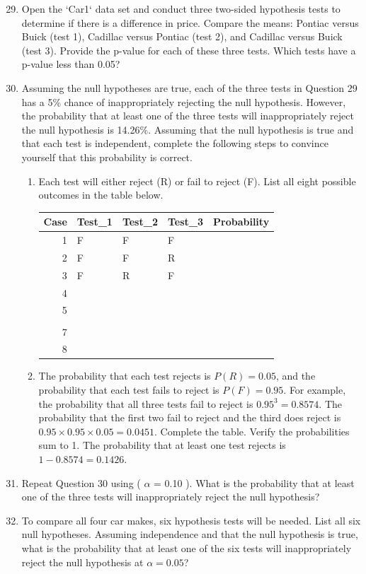 \documentclass[
]{report}
\begin{document}
\begin{enumerate}
  \setcounter{enumi}{28}

  \item Open the `Car1` data set and conduct three two-sided hypothesis tests to determine if there is a difference in price. Compare the means: Pontiac versus Buick (test 1), Cadillac versus Pontiac (test 2), and Cadillac versus Buick (test 3). Provide the p-value for each of these three tests. Which tests have a p-value less than 0.05?

  \item Assuming the null hypotheses are true, each of the three tests in Question 29 has a 5\% chance of inappropriately rejecting the null hypothesis. However, the probability that at least one of the three tests will inappropriately reject the null hypothesis is 14.26\%. Assuming that the null hypothesis is true and that each test is independent, complete the following steps to convince yourself that this probability is correct.
    \begin{enumerate}
      \item Each test will either reject (R) or fail to reject (F). List all eight possible outcomes in the table below.

\begin{tabular}{rllll}
\toprule
Case & Test\_1 & Test\_2 & Test\_3 & Probability\\
\midrule
1 & F & F & F & \\
2 & F & F & R & \\
3 & F & R & F & \\
4 &  &  &  & \\
5 &  &  &  & \\
\addlinespace
6 &  &  &  & \\
7 &  &  &  & \\
8 &  &  &  & \\
\bottomrule
\end{tabular}


      
      \item The probability that each test rejects is \( P(R) = 0.05 \), and the probability that each test fails to reject is \( P(F) = 0.95 \). For example, the probability that all three tests fail to reject is \( 0.95^3 = 0.8574 \). The probability that the first two fail to reject and the third does reject is \( 0.95 \times 0.95 \times 0.05 = 0.0451 \). Complete the table. Verify the probabilities sum to 1. The probability that at least one test rejects is \( 1 - 0.8574 = 0.1426 \).
    \end{enumerate}

  \item Repeat Question 30 using ( $\alpha$ = 0.10 ). What is the probability that at least one of the three tests will inappropriately reject the null hypothesis?

  \item To compare all four car makes, six hypothesis tests will be needed. List all six null hypotheses. Assuming independence and that the null hypothesis is true, what is the probability that at least one of the six tests will inappropriately reject the null hypothesis at \( \alpha = 0.05 \)?
\end{enumerate}
\end{document}
